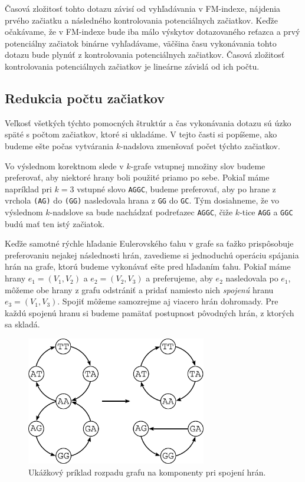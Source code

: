 Časová zložitosť tohto dotazu závisí od vyhľadávania v FM-indexe, nájdenia
prvého začiatku a následného
kontrolovania potenciálnych začiatkov. Keďže očakávame, že v FM-indexe bude
iba málo výskytov dotazovaného reťazca a prvý potenciálny začiatok binárne
vyhľadávame, väčšina času vykonávania tohto dotazu bude plynúť z kontrolovania
potenciálnych začiatkov. Časová zložitosť kontrolovania potenciálnych začiatkov
je lineárne závislá od ich počtu.

\subsection{Redukcia počtu začiatkov}

Veľkosť všetkých týchto pomocných štruktúr a čas vykonávania
dotazu sú úzko späté s počtom začiatkov, ktoré si ukladáme. V tejto
časti si popíšeme, ako budeme ešte počas vytvárania $k$-nadslova zmenšovať
počet týchto začiatkov.

Vo výslednom korektnom slede v $k$-grafe vstupnej
množiny slov budeme preferovať, aby niektoré hrany boli použité priamo po sebe.
Pokiaľ máme napríklad pri $k = 3$ vstupné slovo \verb_AGGC_, budeme preferovať,
aby po hrane z vrchola \verb_(AG)_ do \verb_(GG)_ nasledovala hrana z \verb_GG_
do \verb_GC_. Tým dosiahneme, že vo výslednom $k$-nadslove sa bude nachádzať
podreťazec \verb_AGGC_, čiže $k$-tice \verb_AGG_ a \verb_GGC_ budú mať ten istý
začiatok.

Keďže samotné rýchle hľadanie Eulerovského ťahu v grafe sa ťažko prispôsobuje
preferovaniu nejakej následnosti hrán, zavedieme si jednoduchú
operáciu spájania hrán na grafe, ktorú budeme vykonávať ešte pred hľadaním ťahu. Pokiaľ
máme hrany $e_1 = (V_1, V_2)$ a $e_2 = (V_2, V_3)$ a preferujeme, aby $e_2$
nasledovala po $e_1$, môžeme obe hrany z grafu odstrániť a pridať namiesto nich \emph{spojenú}
hranu $e_3 = (V_1, V_3)$. Spojiť môžeme samozrejme aj viacero hrán dohromady. Pre
každú spojenú hranu si budeme pamätať postupnost pôvodných hrán, z ktorých sa
skladá.

\begin{figure}

\centerline{\includegraphics[width=0.7\textwidth]{images/rozpadnutie-3-3.pdf}}

\caption[Zvýšenie počtu komponentov]{Ukážkový príklad rozpadu grafu na komponenty
pri spojení hrán.}

\label{obr:rozpad}

\end{figure}

